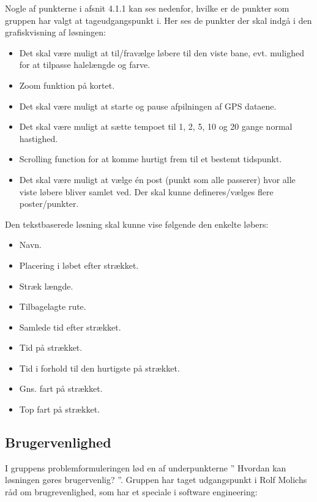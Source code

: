 Nogle af punkterne i afsnit 4.1.1 kan ses nedenfor, hvilke er de punkter som gruppen har valgt at tageudgangspunkt i. Her ses de punkter der skal indgå i den grafiskvisning af løsningen:
\begin{itemize}
\item Det skal være muligt at til/fravælge løbere til den viste bane, evt. mulighed for at tilpasse halelængde og farve.
\item Zoom funktion på kortet.
\item Det skal være muligt at starte og pause afpilningen af GPS dataene.
\item Det skal være muligt at sætte tempoet til 1, 2, 5, 10 og 20 gange normal hastighed.
\item Scrolling function for at komme hurtigt frem til et bestemt tidspunkt.
\item Det skal være muligt at vælge én post (punkt som alle passerer) hvor alle viste løbere bliver samlet ved. Der skal kunne defineres/vælges flere poster/punkter.
\end{itemize}
Den tekstbaserede løsning skal kunne vise følgende den enkelte løbers:
\begin{itemize}
\item Navn.
\item Placering i løbet efter strækket.
\item Stræk længde.
\item Tilbagelagte rute.
\item Samlede tid efter strækket.
\item Tid på strækket.
\item Tid i forhold til den hurtigste på strækket.
\item Gns. fart på strækket.
\item Top fart på strækket.
\end{itemize}


\subsection{Brugervenlighed}
I gruppens problemformuleringen lød en af underpunkterne ” Hvordan kan løsningen gøres brugervenlig? ”. Gruppen har taget udgangspunkt i Rolf Molichs råd om brugrevenlighed, som har et speciale i software engineering: %

